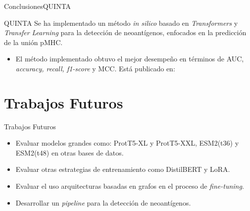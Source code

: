 \documentclass[10pt]{beamer}
\newcommand{\chref}[3][blue]{\href{#2}{\color{#1}{#3}}}%
\newcommand{\chref}[2]{	\href{#1}{{\usebeamercolor[bg]{Feather}#2}} }
\newcommand{\chref}[3][blue]{\href{#2}{\color{#1}{#3}}}%
\newcommand{\1}{
	\setbeamertemplate{background}{
		\texttt{[image: img/1]}
		\tikz[overlay] \fill[fill opacity=0.75,fill=white] (0,0) rectangle (-\paperwidth,\paperheight);
	}
}
\begin{document}
\begin{frame}{Conclusiones}{QUINTA}	
	\begin{block}{QUINTA}
		Se ha implementado un método  \textit{in silico} basado en \textit{Transformers} y \textit{Transfer Learning} para la detección de neoantígenos, enfocados en la predicción de la unión pMHC. 
		
		\begin{itemize}
			\item El método implementado obtuvo el mejor desempeño en términos de AUC, \textit{accuracy, recall, f1-score} y MCC. Está publicado en: \chref{https://github.com/arceda/pmhc}{https://github.com/arceda/pmhc}	
		\end{itemize}
		
	\end{block}	


\end{frame}


\section{Trabajos Futuros}

\begin{frame}{Trabajos Futuros}{}	
	\begin{block}{}
		\begin{itemize}
			\item Evaluar modelos grandes como: ProtT5-XL y ProtT5-XXL, ESM2(t36) y ESM2(t48) en otras bases de datos.
			\item Evaluar otras estrategias de entrenamiento como DistilBERT y LoRA.
			\item Evaluar el uso arquitecturas basadas en grafos en el proceso de \textit{fine-tuning}.
			\item Desarrollar un \textit{pipeline} para la detección de neoantígenos.
		\end{itemize}
	\end{block}	
	
	
\end{frame}
\end{document}
